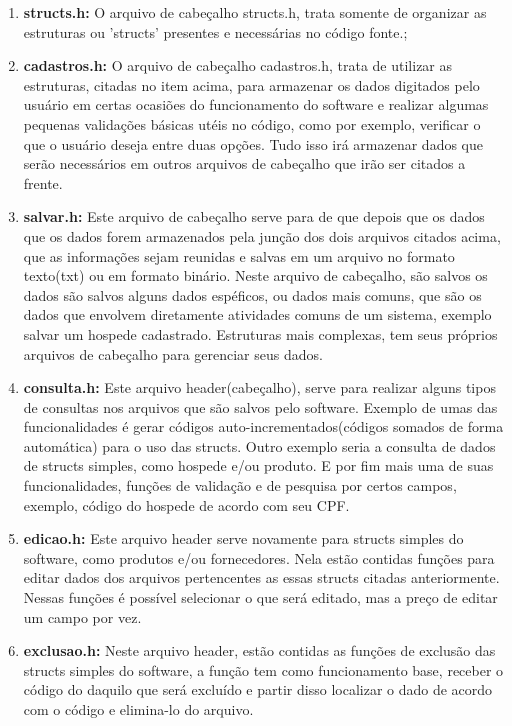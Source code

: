 \documentclass{article}
\begin{document}
  	\begin{enumerate}
  		\item \textbf{structs.h:} O arquivo de cabeçalho structs.h, trata somente de organizar as estruturas ou 'structs' presentes e necessárias no código fonte.;\\
  		\item \textbf{cadastros.h:} O arquivo de cabeçalho cadastros.h, trata de utilizar as estruturas, citadas no item acima, para armazenar os dados digitados pelo usuário em certas ocasiões do funcionamento do software e realizar algumas pequenas validações básicas utéis no código, como por exemplo, verificar o que o usuário deseja entre duas opções. Tudo isso irá armazenar dados que serão necessários em outros arquivos de cabeçalho que irão ser citados a frente.\\
  		\item \textbf{salvar.h:} Este arquivo de cabeçalho serve para de que depois que os dados que os dados forem armazenados pela junção dos dois arquivos citados acima, que as informações sejam reunidas e salvas em um arquivo no formato texto(txt) ou em formato binário. Neste arquivo de cabeçalho, são salvos os dados são salvos alguns dados espéficos, ou dados mais comuns, que são os dados que envolvem diretamente atividades comuns de um sistema, exemplo salvar um hospede cadastrado. Estruturas mais complexas, tem seus próprios arquivos de cabeçalho para gerenciar seus dados.\\
  		\item \textbf{consulta.h:} Este arquivo header(cabeçalho), serve para realizar alguns tipos de consultas nos arquivos que são salvos pelo software. Exemplo de umas das funcionalidades é gerar códigos auto-incrementados(códigos somados de forma automática) para o uso das structs. Outro exemplo seria a consulta de dados de structs simples, como hospede e/ou produto. E por fim mais uma de suas funcionalidades, funções de validação e de pesquisa por certos campos, exemplo, código do hospede de acordo com seu CPF.\\
  		\item \textbf{edicao.h:} Este arquivo header serve novamente para structs simples do software, como produtos e/ou fornecedores. Nela estão contidas funções para editar dados dos arquivos pertencentes as essas structs citadas anteriormente. Nessas funções é possível selecionar o que será editado, mas a preço de editar um campo por vez.\\
  		\item \textbf{exclusao.h:} Neste arquivo header, estão contidas as funções de exclusão das structs simples do software, a função tem como funcionamento base, receber o código do daquilo que será excluído e partir disso localizar o dado de acordo com o código e elimina-lo do arquivo.\\

\end{enumerate}
\end{document}

